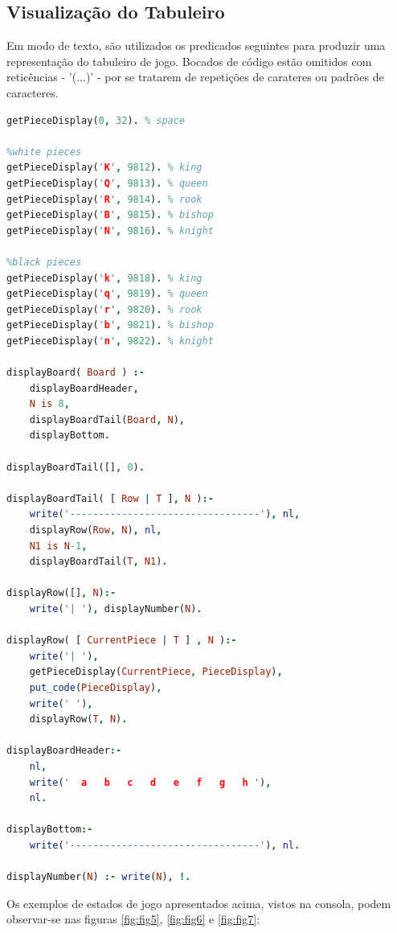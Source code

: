 \documentclass[a4paper]{article}
\begin{document}
\subsection{Visualização do Tabuleiro}
Em modo de texto, são utilizados os predicados seguintes para produzir uma representação do tabuleiro de jogo. Bocados de código estão omitidos com reticências - '(...)' - por se tratarem de repetições de carateres ou padrões de caracteres.\linebreak

\begin{small}
\begin{lstlisting}[language=Prolog]
getPieceDisplay(0, 32). % space

%white pieces
getPieceDisplay('K', 9812). % king
getPieceDisplay('Q', 9813). % queen
getPieceDisplay('R', 9814). % rook
getPieceDisplay('B', 9815). % bishop
getPieceDisplay('N', 9816). % knight

%black pieces
getPieceDisplay('k', 9818). % king
getPieceDisplay('q', 9819). % queen
getPieceDisplay('r', 9820). % rook
getPieceDisplay('b', 9821). % bishop
getPieceDisplay('n', 9822). % knight

displayBoard( Board ) :-
	displayBoardHeader,
	N is 8,
	displayBoardTail(Board, N),
	displayBottom.

displayBoardTail([], 0).

displayBoardTail( [ Row | T ], N ):-
	write('---------------------------------'), nl,
	displayRow(Row, N), nl,
	N1 is N-1,
	displayBoardTail(T, N1).

displayRow([], N):-
	write('| '), displayNumber(N).

displayRow( [ CurrentPiece | T ] , N ):-
	write('| '),
	getPieceDisplay(CurrentPiece, PieceDisplay),
	put_code(PieceDisplay),
	write(' '),
	displayRow(T, N).

displayBoardHeader:-
	nl,
	write('  a   b   c   d   e   f   g   h '),
	nl.

displayBottom:-
	write('---------------------------------'), nl.

displayNumber(N) :- write(N), !.
\end{lstlisting}
\end{small}

Os exemplos de estados de jogo apresentados acima, vistos na consola, podem observar-se nas figuras \ref{fig:fig5}, \ref{fig:fig6} e \ref{fig:fig7}:
\end{document}
